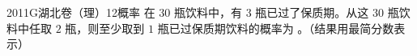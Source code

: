 
\begin{problem}{2011}{G}{湖北卷（理）}{12}{概率}
在 $30$ 瓶饮料中，有 $3$ 瓶已过了保质期。从这 $30$ 瓶饮料中任取 $2$ 瓶，则至少取到 $1$ 瓶已过保质期饮料的概率为 \underline{\hspace{4em}}。（结果用最简分数表示）
\end{problem}

\begin{answer}

\end{answer}

\begin{solutions}

\end{solutions}